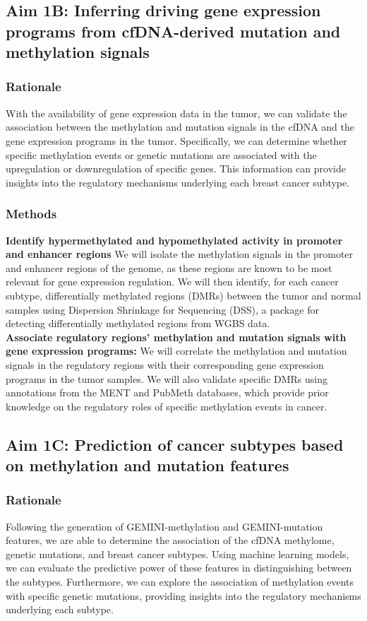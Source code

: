 \documentclass[11pt]{article}
\begin{document}
\subsection*{Aim 1B: Inferring driving gene expression programs from cfDNA-derived mutation and methylation signals}
\subsubsection*{Rationale}
With the availability of gene expression data in the tumor, we can validate the association between the methylation and mutation signals in the cfDNA and the gene expression programs in the tumor. Specifically, we can determine whether specific methylation events or genetic mutations are associated with the upregulation or downregulation of specific genes. This information can provide insights into the regulatory mechanisms underlying each breast cancer subtype.
\subsubsection*{Methods}
\textbf{Identify hypermethylated and hypomethylated activity in promoter and enhancer regions} We will isolate the methylation signals in the promoter and enhancer regions of the genome, as these regions are known to be most relevant for gene expression regulation. 
We will then identify, for each cancer subtype, differentially methylated regions (DMRs) between the tumor and normal samples using Dispersion Shrinkage for Sequencing (DSS), a package for detecting differentially methylated regions from WGBS data. 
\medskip \\
\textbf{Associate regulatory regions' methylation and mutation signals with gene expression programs:} We will correlate the methylation and mutation signals in the regulatory regions with their corresponding gene expression programs in the tumor samples. We will also validate specific DMRs using annotations from the MENT and PubMeth databases, which provide prior knowledge on the regulatory roles of specific methylation events in cancer.

\subsection*{Aim 1C: Prediction of cancer subtypes based on methylation and mutation features}
\subsubsection*{Rationale}
Following the generation of GEMINI-methylation and GEMINI-mutation features,
we are able to determine the association of the cfDNA methylome, genetic mutations,
and breast cancer subtypes. Using machine learning models, we can evaluate the 
predictive power of these features in distinguishing between the subtypes.
Furthermore, we can explore the association of methylation events with specific
genetic mutations, providing insights into the regulatory mechanisms underlying
each subtype.
\end{document}
